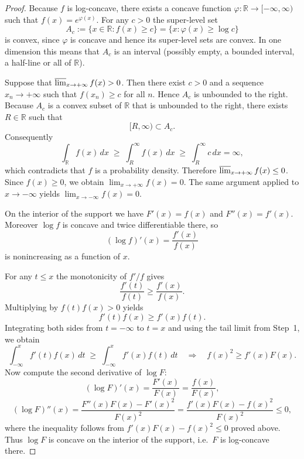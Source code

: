 \documentclass[12pt]{article}
\renewcommand{\(}{\left(}%
\renewcommand{\)}{\right)}%
\renewcommand{\[}{\left[}%
\renewcommand{\]}{\right]}%
\newtheorem{proof}{Proof.}}
\begin{document}
\begin{proof}

Because $f$ is log-concave, there exists a concave function
$\varphi:\mathbb{R}\to[-\infty,\infty)$ such that $f(x)=e^{\varphi(x)}.$
For any $c>0$ the super-level set
\begin{equation*}
A_c := \{x\in\mathbb{R} : f(x)\ge c\} = \{x : \varphi(x)\ge \log c\}
\end{equation*}
is convex, since $\varphi$ is concave and hence its super-level sets are
convex. In one dimension this means that $A_c$ is an interval (possibly
empty, a bounded interval, a half-line or all of $\mathbb{R}$).

Suppose that $\varlimsup_{x\to+\infty} f(x) > 0$. Then there exist $c>0$
and a sequence $x_n\to+\infty$ such that $f(x_n)\ge c$ for all $n$.
Hence $A_c$ is unbounded to the right. Because $A_c$ is a convex subset
of $\mathbb{R}$ that is unbounded to the right, there exists $R\in
\mathbb{R}$ such that
\begin{equation*}
[R,\infty) \subset A_c .
\end{equation*}
Consequently
\begin{equation*}
\int_{\mathbb{R}} f(x)\,dx
\;\ge\;
\int_R^\infty f(x)\,dx
\;\ge\;
\int_R^\infty c\,dx
= \infty ,
\end{equation*}
which contradicts that $f$ is a probability density. Therefore $\varlimsup_{x\to+\infty} f(x)\le 0$.
Since $f(x)\ge 0$, we obtain $\lim_{x\to+\infty} f(x) = 0 .$
The same argument applied to $x\to-\infty$ yields $\lim_{x\to-\infty} f(x) = 0$.

On the interior of the support we have $F'(x)=f(x)$ and $F''(x)=f'(x)$.
Moreover $\log f$ is concave and twice differentiable there, so
\begin{equation*}
(\log f)'(x) = \frac{f'(x)}{f(x)}
\end{equation*}
is nonincreasing as a function of $x$.

For any $t\le x$ the monotonicity of $f'/f$ gives
\begin{equation*}
\frac{f'(t)}{f(t)} \ge \frac{f'(x)}{f(x)}.
\end{equation*}
Multiplying by $f(t)f(x)>0$ yields
\begin{equation*}
f'(t) f(x) \ge f'(x) f(t).
\end{equation*}
Integrating both sides from $t=-\infty$ to $t=x$ and using the tail
limit from Step~1, we obtain
\begin{equation*}
\int_{-\infty}^x f'(t) f(x)\,dt
\;\ge\;
\int_{-\infty}^x f'(x) f(t)\,dt
\quad\Longrightarrow\quad
f(x)^2 \ge f'(x) F(x).
\end{equation*}
Now compute the second derivative of $\log F$:
\begin{equation*}
(\log F)'(x) = \frac{F'(x)}{F(x)} = \frac{f(x)}{F(x)},
\end{equation*}
\begin{equation*}
(\log F)''(x)
= \frac{F''(x)F(x)-F'(x)^2}{F(x)^2}
= \frac{f'(x)F(x)-f(x)^2}{F(x)^2}
\le 0,
\end{equation*}
where the inequality follows from $f'(x)F(x)-f(x)^2\le 0$ proved above.
Thus $\log F$ is concave on the interior of the support, i.e.\ $F$ is
log-concave there.


\end{proof}
\end{document}
